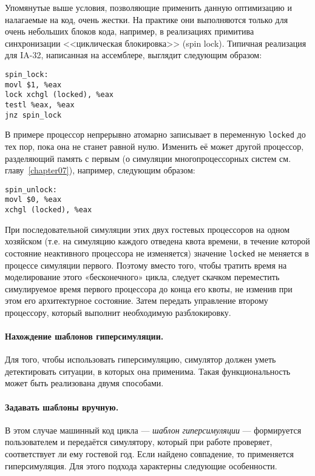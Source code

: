 Упомянутые выше условия, позволяющие применить данную оптимизацию и налагаемые на код, очень жестки. На практике они выполняются только для очень небольших блоков кода, например, в реализациях примитива синхронизации <<циклическая блокировка>> (\abbr spin lock). Типичная реализация для IA-32, написанная на ассемблере, выглядит следующим образом:

\begin{lstlisting}
spin_lock:
movl $1, %eax
lock xchgl (locked), %eax
testl %eax, %eax
jnz spin_lock
\end{lstlisting}

В примере процессор непрерывно атомарно записывает в переменную \texttt{locked} до тех пор, пока она не станет равной нулю. Изменить её может другой процессор, разделяющий память с первым (о симуляции многопроцессорных систем см. главу~\ref{chapter07}), например, следующим образом:

\begin{lstlisting}
spin_unlock:
movl $0, %eax
xchgl (locked), %eax
\end{lstlisting}

При последовательной симуляции этих двух гостевых процессоров на одном хозяйском (т.е. на симуляцию каждого отведена квота времени, в течение которой состояние неактивного процессора не изменяется) значение \texttt{locked} не меняется в процессе симуляции первого. Поэтому вместо того, чтобы тратить время на моделирование этого «бесконечного» цикла, следует скачком переместить симулируемое время первого процессора до конца его квоты, не изменив при этом его архитектурное состояние. Затем передать управление второму процессору, который выполнит необходимую разблокировку.

\paragraph{Нахождение шаблонов гиперсимуляции.} Для того, чтобы использовать гиперсимуляцию, симулятор должен уметь детектировать ситуации, в которых она применима. Такая функциональность может быть реализована двумя способами.

\paragraph{Задавать шаблоны вручную.} В этом случае машинный код цикла --- \emph{шаблон гиперсимуляции} --- формируется пользователем и передаётся симулятору, который при работе проверяет, соответствует ли ему гостевой год. Если найдено совпадение, то применяется гиперсимуляция. Для этого подхода характерны следующие особенности.

